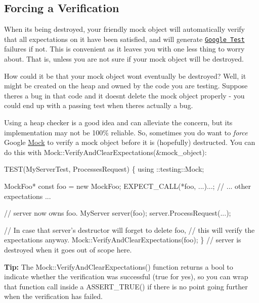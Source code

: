 \subsection*{Forcing a Verification}

When it\textquotesingle{}s being destroyed, your friendly mock object will automatically verify that all expectations on it have been satisfied, and will generate \href{../../googletest/}{\tt Google Test} failures if not. This is convenient as it leaves you with one less thing to worry about. That is, unless you are not sure if your mock object will be destroyed.

How could it be that your mock object won\textquotesingle{}t eventually be destroyed? Well, it might be created on the heap and owned by the code you are testing. Suppose there\textquotesingle{}s a bug in that code and it doesn\textquotesingle{}t delete the mock object properly -\/ you could end up with a passing test when there\textquotesingle{}s actually a bug.

Using a heap checker is a good idea and can alleviate the concern, but its implementation may not be 100\% reliable. So, sometimes you do want to {\itshape force} Google \hyperlink{classMock}{Mock} to verify a mock object before it is (hopefully) destructed. You can do this with {\ttfamily Mock\+::\+Verify\+And\+Clear\+Expectations(\&mock\+\_\+object)}\+:


\begin{DoxyCode}
TEST(MyServerTest, ProcessesRequest) \{
  using ::testing::Mock;

  MockFoo* \textcolor{keyword}{const} foo = \textcolor{keyword}{new} MockFoo;
  EXPECT\_CALL(*foo, ...)...;
  \textcolor{comment}{// ... other expectations ...}

  \textcolor{comment}{// server now owns foo.}
  MyServer server(foo);
  server.ProcessRequest(...);

  \textcolor{comment}{// In case that server's destructor will forget to delete foo,}
  \textcolor{comment}{// this will verify the expectations anyway.}
  Mock::VerifyAndClearExpectations(foo);
\}  \textcolor{comment}{// server is destroyed when it goes out of scope here.}
\end{DoxyCode}


{\bfseries Tip\+:} The {\ttfamily Mock\+::\+Verify\+And\+Clear\+Expectations()} function returns a {\ttfamily bool} to indicate whether the verification was successful ({\ttfamily true} for yes), so you can wrap that function call inside a {\ttfamily A\+S\+S\+E\+R\+T\+\_\+\+T\+R\+U\+E()} if there is no point going further when the verification has failed.

